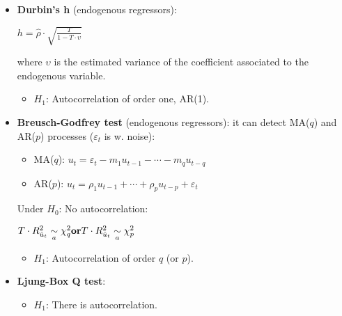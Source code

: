 \documentclass[10pt, a4paper, landscape]{article}
\begin{document}
\begin{multicols}{3}
\begin{itemize}[leftmargin=*]
\begin{itemize}[leftmargin=*]
				\item \textbf{Durbin's h} (endogenous regressors):
				
				\begin{center}
					$h = \hat{\rho} \cdot \sqrt{\frac{T}{1 - T \cdot \upsilon}}$
				\end{center}
				
				where $\upsilon$ is the estimated variance of the coefficient associated to the endogenous variable.
				
				\begin{itemize}[leftmargin=*]
					\item $H_{1}$: Autocorrelation of order one, AR(1).
				\end{itemize}
				
				\item \textbf{Breusch-Godfrey test} (endogenous regressors): it can detect MA($q$) and AR($p$) processes ($\varepsilon_{t}$ is w. noise):
				
				\begin{itemize}[leftmargin=*]
					\item MA($q$): $u_{t} = \varepsilon_{t} - m_{1} u_{t - 1} - \cdots - m_{q} u_{t - q}$
					\item AR($p$): $u_{t} = \rho_{1} u_{t - 1} + \cdots + \rho_{p} u_{t - p}+ \varepsilon_{t}$
				\end{itemize}
				
			\columnbreak
				
				Under $H_{0}$: No autocorrelation:
				
				\begin{center}
					$\hfill T \cdot R^{2}_{\hat{u}_t}\underset{a}{\sim}\chi^{2}_{q} \hfill \textbf{or} \hfill T \cdot R^{2}_{\hat{u}_t}\underset{a}{\sim}\chi^{2}_{p} \hfill$
				\end{center}
				
				\begin{itemize}[leftmargin=*]
					\item $H_{1}$: Autocorrelation of order $q$ (or $p$).
				\end{itemize}
				
				\item \textbf{Ljung-Box Q test}:
				
				\begin{itemize}[leftmargin=*]
					\item $H_{1}$: There is autocorrelation.
				\end{itemize}
			\end{itemize}
		\end{itemize}
		

\end{multicols}
\end{document}

